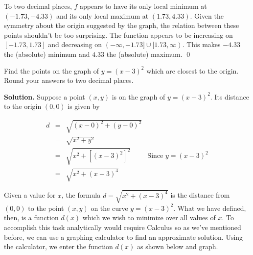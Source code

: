 \begin{ex}
\begin{center}
\begin{tabular}{cc}
\end{tabular}

\end{center}

To two decimal places, $f$ appears to have its only local minimum at $(-1.73, -4.33)$ and its only local maximum at  $(1.73, 4.33)$.  Given the symmetry about the origin suggested by the graph, the relation between these points shouldn't be too surprising.  The function appears to be increasing on $[-1.73, 1.73]$ and decreasing on $(-\infty, -1.73] \cup [1.73,\infty)$.  This makes $-4.33$ the (absolute) minimum and $4.33$ the (absolute) maximum.  \qed


\end{ex}

\begin{ex} \label{distancefunctionex} Find the points on the graph of $y = (x-3)^2$ which are closest to the origin.  Round your answers to two decimal places.

\medskip

{\bf Solution.}  Suppose a point $(x,y)$ is on the graph of $y = (x-3)^2$.  Its distance to the origin $(0,0)$ is given by
 
\setlength{\extrarowheight}{8pt}

\[ \begin{array}{rclr} 

d & = &  \sqrt{(x-0)^2+(y-0)^2} & \\
& = &  \sqrt{x^2+y^2} &  \\
&= & \sqrt{x^2 + \left[(x-3)^2\right]^2} & \mbox{Since $y = (x-3)^2$} \\
& = & \sqrt{x^2 + (x-3)^4} & 

\end{array} \]

\setlength{\extrarowheight}{2pt}

Given a value for $x$, the formula $d =  \sqrt{x^2 + (x-3)^4} $ is the distance from $(0,0)$ to the point $(x,y)$ on the curve $y = (x-3)^2$.  What we have defined, then, is a function $d(x)$ which we wish to minimize over all values of $x$.  To accomplish this task analytically would require Calculus so as we've mentioned before, we can use a graphing calculator to find an approximate solution.   Using the calculator, we enter the function $d(x)$ as shown below and graph.

\begin{center}

\begin{tabular}{cc}


\end{tabular}
\end{center}
\end{ex}
